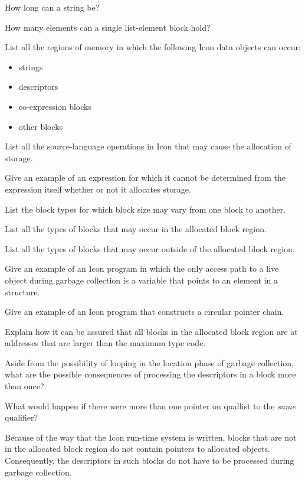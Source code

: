  How long can a string be?

 How many elements can a single list-element block
hold?

 List all the regions of memory in which the
following Icon data objects can occur:
\begin{itemize}
\item 
strings
\item 
descriptors
\item 
co-expression blocks
\item 
other blocks
\end{itemize}

 List all the source-language operations in Icon
that may cause the allocation of storage.

 Give an example of an expression for which it
cannot be determined from the expression itself whether or not it
allocates storage.

 List the block types for which block size may
vary from one block to another.

 List all the types of blocks that may occur in
the allocated block region.

 List all the types of blocks that may occur
outside of the allocated block region.

 Give an example of an Icon program in which the
only access path to a live object during garbage collection is a
variable that points to an element in a structure.

 Give an example of an Icon program that
constructs a circular pointer chain.

 Explain how it can be assured that all blocks in
the allocated block region are at addresses that are larger than the
maximum type code.

 Aside from the possibility of looping in the
location phase of garbage collection, what are the possible
consequences of processing the descriptors in a block more than once?

 What would happen if there were more than one
pointer on quallist to the \textit{same} qualifier?

 Because of the way that the Icon run-time system
is written, blocks that are not in the allocated block region do not
contain pointers to allocated objects. Consequently, the descriptors
in such blocks do not have to be processed during garbage collection.

